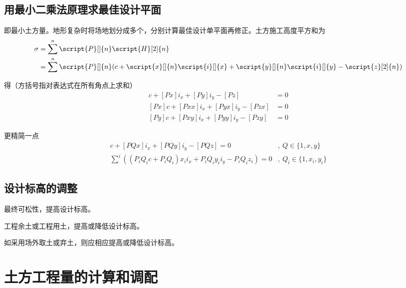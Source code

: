 \documentclass{book}
\begin{document}
\subsection{用最小二乘法原理求最佳设计平面}
\par 即最小土方量。地形复杂时将场地划分成多个，分别计算最佳设计单平面再修正。土方施工高度平方和为
\begin{align*}
    \sigma & = \sum^n \script{P}[]{n} \script{H}[2]{n}                                                                  \\
           & = \sum^n \script{P}[]{n}(c+\script{x}[]{n}\script{i}[]{x}+\script{y}[]{n}\script{i}[]{y}-\script{z}[2]{n})
\end{align*}
\par 得（方括号指对表达式在所有角点上求和）
\begin{align*}
    [P]c + [Px]i_x + [Py]i_y - [Pz]     & = 0 \\
    [Px]c + [Pxx]i_x + [Pyx]i_y - [Pzx] & = 0 \\
    [Py]c + [Pxy]i_x + [Pyy]i_y - [Pzy] & = 0
\end{align*}
\par 更精简一点
\begin{align*}
    [PQ]c + [PQx]i_x + [PQy]i_y - [PQz] = 0                          & ,\ Q \in \{1, x, y\}       \\
    \sum^i ((P_iQ_ic + P_iQ_i)x_ii_x + P_iQ_iy_ii_y - P_iQ_iz_i) = 0 & ,\ Q_i \in \{1, x_i, y_i\}
\end{align*}
\subsection{设计标高的调整}
\par 最终可松性，提高设计标高。
\par 工程余土或工程用土，提高或降低设计标高。
\par 如采用场外取土或弃土，则应相应提高或降低设计标高。
\section{土方工程量的计算和调配}
\end{document}
